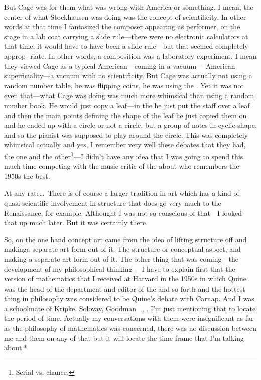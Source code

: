 But Cage was for them what was wrong with America or something. 
I mean, the center of what Stockhausen was doing was the 
concept of scientificity. In other words at that time I fantasized the 
composer appearing as performer, on the stage in a lab coat carrying a 
slide rule---there were no electronic calculators at that time, it would 
have to have been a slide rule---but that seemed completely approp- 
riate. In other words, a composition was a laboratory experiment. I 
mean they viewed Cage as a typical American---coming in a vacuum--- 
American superficiality---a vacuum with no scientificity. But Cage was 
actually not using a random number table, he was flipping coins, he 
was using the . Yet it was not even that---what Cage was doing 
was much more whimsical than using a random number book. He 
would just copy a leaf---in the  he just 
put the staff over a leaf and then the main points defining the shape of 
the leaf he just copied them on and he ended up with a circle or not a 
circle, but a group of notes in cyclic shape, and so the pianist was 
supposed to play around the circle. This was completely whimsical 
actually and yes, I remember very well these debates that they had, the 
one and the other\footnote{Serial vs. chance.}---I didn't have any idea that I was going to spend 
this much time competing with the music critic of the 
about who remembers the 1950s the best. 

At any rate\ldots\  There is of course a larger tradition in art which has 
a kind of quasi-scientific involvement in structure that does go very 
much to the Renaissance, for example. Althought I was not so conscious 
of that---I looked that up much later. But it was certainly there. 

So, on the one hand concept art came from the idea of lifting 
structure off and makinga separate art form out of it. The structure or 
conceptual aspect, and making a separate art form out of it. The other 
thing that was coming---the development of my philosophical thinking 
---I have to explain first that the version of mathematics that I received 
at Harvard in the 1950s in which Quine was the head of the department 
and editor of the  and so forth and the 
hottest thing in philosophy was considered to be Quine's debate with 
Carnap. And I was a schoolmate of Kripke, Solovay, Goodman \etc\ 
\etc, \etc. I'm just mentioning that to locate the period of time. Actually 
my conversations with them were insignificant as far as the philosophy 
of mathematics was concerned, there was no discussion between me 
and them on any of that but it will locate the time frame that I'm talking 
about.* 

